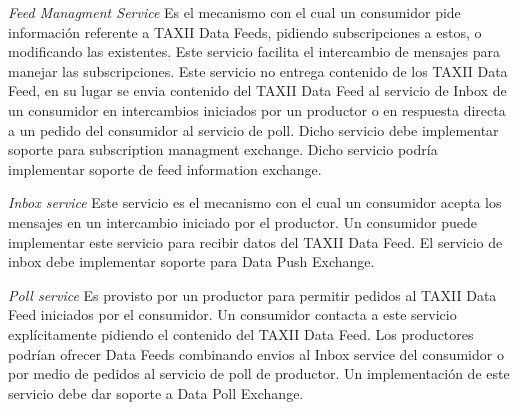 \emph{Feed Managment Service}
Es el mecanismo con el cual un consumidor pide información referente a TAXII 
Data Feeds, pidiendo subscripciones a estos, o modificando las existentes. Este 
servicio facilita el intercambio de mensajes para manejar las subscripciones. 
Este servicio no entrega contenido de los TAXII Data Feed, en su lugar se envia 
contenido del TAXII Data Feed al servicio de Inbox de un consumidor en intercambios 
iniciados por un productor o en respuesta directa a un pedido del consumidor al 
servicio de poll.
Dicho servicio debe implementar soporte para subscription managment exchange.
Dicho servicio podría implementar soporte de feed information exchange.

\emph{Inbox service}
Este servicio es el mecanismo con el cual un consumidor acepta los mensajes en 
un intercambio iniciado por el productor. Un consumidor puede implementar este 
servicio para recibir datos del TAXII Data Feed.
El servicio de inbox debe implementar soporte para Data Push Exchange.

\emph{Poll service}
Es provisto por un productor para permitir pedidos al TAXII Data Feed iniciados 
por  el consumidor. Un consumidor contacta a este servicio explícitamente 
pidiendo el contenido del TAXII Data Feed. Los productores podrían ofrecer Data 
Feeds combinando envios al Inbox service del consumidor o por medio de pedidos 
al servicio de poll de productor.
Un implementación de este servicio debe dar soporte a Data Poll Exchange.

